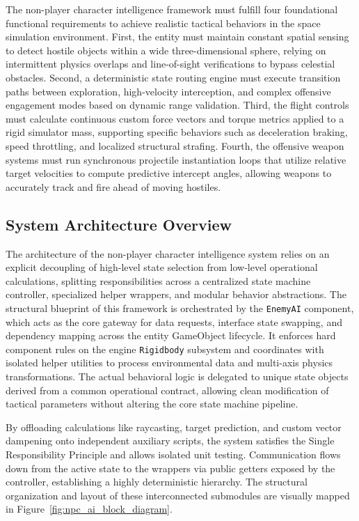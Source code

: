 \documentclass[12pt]{report}
\begin{document}
The non-player character intelligence framework must fulfill four foundational functional requirements to achieve realistic tactical behaviors in the space simulation environment. First, the entity must maintain constant spatial sensing to detect hostile objects within a wide three-dimensional sphere, relying on intermittent physics overlaps and line-of-sight verifications to bypass celestial obstacles. Second, a deterministic state routing engine must execute transition paths between exploration, high-velocity interception, and complex offensive engagement modes based on dynamic range validation. Third, the flight controls must calculate continuous custom force vectors and torque metrics applied to a rigid simulator mass, supporting specific behaviors such as deceleration braking, speed throttling, and localized structural strafing. Fourth, the offensive weapon systems must run synchronous projectile instantiation loops that utilize relative target velocities to compute predictive intercept angles, allowing weapons to accurately track and fire ahead of moving hostiles.
\subsection{System Architecture Overview}

The architecture of the non-player character intelligence system relies on an explicit decoupling of high-level state selection from low-level operational calculations, splitting responsibilities across a centralized state machine controller, specialized helper wrappers, and modular behavior abstractions. The structural blueprint of this framework is orchestrated by the \texttt{EnemyAI} component, which acts as the core gateway for data requests, interface state swapping, and dependency mapping across the entity GameObject lifecycle. It enforces hard component rules on the engine \texttt{Rigidbody} subsystem and coordinates with isolated helper utilities to process environmental data and multi-axis physics transformations. The actual behavioral logic is delegated to unique state objects derived from a common operational contract, allowing clean modification of tactical parameters without altering the core state machine pipeline. 

By offloading calculations like raycasting, target prediction, and custom vector dampening onto independent auxiliary scripts, the system satisfies the Single Responsibility Principle and allows isolated unit testing. Communication flows down from the active state to the wrappers via public getters exposed by the controller, establishing a highly deterministic hierarchy. The structural organization and layout of these interconnected submodules are visually mapped in Figure~\ref{fig:npc_ai_block_diagram}.
\end{document}
